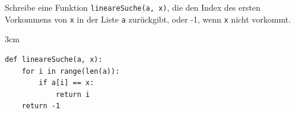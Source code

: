 \question[3]
Schreibe eine Funktion \texttt{lineareSuche(a, x)}, die den Index des ersten Vorkommens von \texttt{x} in der Liste \texttt{a} zurückgibt, oder -1, wenn \texttt{x} nicht vorkommt.
\begin{solutionbox}{3cm}
\begin{lstlisting}
def lineareSuche(a, x):
    for i in range(len(a)):
        if a[i] == x:
            return i
    return -1
\end{lstlisting}
\end{solutionbox}

